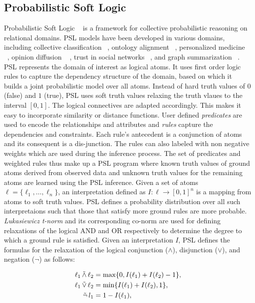 \subsection{Probabilistic Soft Logic}
Probabilistic Soft Logic ~\cite{kimmig2012short} is a framework for collective probabilistic reasoning on relational domains.
PSL models have been developed in various domains, including collective classification ~\cite{broecheler2010computing}, ontology alignment ~\cite{brocheler2012probabilistic}, personalized medicine ~\cite{bach2010decision}, opinion diffusion ~\cite{bach2012scaling} , trust in social networks ~\cite{huang2012probabilistic}, and graph summarization ~\cite{memory2012graph}.
PSL represents the domain of interest as logical atoms.
It uses first order logic rules to capture the dependency structure of the domain, based on which it builds a joint probabilistic model over all atoms.
Instead of hard truth values of $0$ (false) and $1$ (true), PSL uses soft truth values relaxing the truth vlaues to the interval $[0,1]$.
The logical connectives are adapted accordingly.
This makes it easy to incorporate similarity or distance functions.
\newline
User defined \emph{predicates} are used to encode the relationships and attributes and \emph{rules} capture the  dependencies and constraints.
Each rule's antecedent is a conjunction of atoms and its consequent is a dis-junction. 
The rules can also labeled with non negative weights which are used during the inference process. 
The set of predicates and weighted rules thus make up a PSL program where known truth values of ground atoms derived from observed data and unknown truth values for the remaining atoms are learned using the PSL inference.
\newline
Given a set of atoms 
$\ell = \{\ell_1,\ldots,\ell_n\}$,
an interpretation defined as 
$I : \ell \rightarrow [0,1]^n$
is a mapping from atoms to soft truth values.
PSL defines a probability distribution over all such interpretaions such that those that satisfy more ground rules are more probable.
\emph{Lukasiewicz t-norm} and its corresponding co-norm are used for defining relaxations of the logical AND and OR respectively to determine the degree to which a ground rule is satisfied.
Given an interpretation $\mathit{I}$, PSL defines the formulas for the relaxation of the logical conjunction ($\wedge$), disjunction ($\vee$), and negation ($\neg$) as follows:

\begin{align*}
\ell_1 \softand \ell_2 &= \max\{0, I(\ell_1) + I(\ell_2) - 1\},\\
\ell_1 \softor \ell_2 &= \min\{I(\ell_1) + I(\ell_2), 1\},\\
\softneg l_1 &= 1 - I(\ell_1),
\end{align*}  


